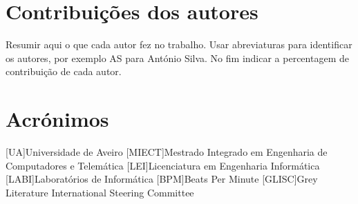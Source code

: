 \documentclass{report}
\begin{document}
\chapter*{Contribuições dos autores}
Resumir aqui o que cada autor fez no trabalho.
Usar abreviaturas para identificar os autores,
por exemplo AS para António Silva.
No fim indicar a percentagem de contribuição de cada autor.

\chapter*{Acrónimos}
\begin{acronym}
[UA]{Universidade de Aveiro}
[MIECT]{Mestrado Integrado em Engenharia de Computadores e Telemática}
[LEI]{Licenciatura em Engenharia Informática}
[LABI]{Laboratórios de Informática}
[BPM]{Beats Per Minute}
[GLISC]{Grey Literature International Steering Committee}
\end{acronym}


\printbibliography
\end{document}
